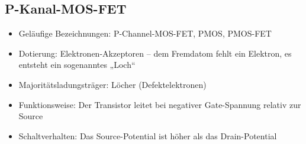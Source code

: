 \subsection{P-Kanal-MOS-FET}
\begin{itemize}
	\item Geläufige Bezeichnungen: P-Channel-MOS-FET, PMOS, PMOS-FET
	\item Dotierung: Elektronen-Akzeptoren – dem Fremdatom fehlt ein Elektron, es entsteht ein sogenanntes „Loch“
	\item Majoritätsladungsträger: Löcher (Defektelektronen)
	\item Funktionsweise: Der Transistor leitet bei negativer Gate-Spannung relativ zur Source
	\item Schaltverhalten: Das Source-Potential ist höher als das Drain-Potential
\end{itemize}

